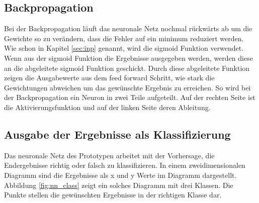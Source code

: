 
\subsection{Backpropagation}
Bei der Backpropagation läuft das neuronale Netz nochmal rückwärts ab um die Gewichte so zu verändern, dass die Fehler auf ein minimum reduziert werden. Wie schon in Kapitel \ref{sec:inp} genannt, wird die sigmoid Funktion verwendet. Wenn aus der sigmoid Funktion die Ergebnisse ausgegeben werden, werden diese an die abgeleitete sigmoid Funktion geschickt. Durch diese abgeleitete Funktion zeigen die Ausgabewerte aus dem feed forward Schritt, wie stark die Gewichtungen abweichen um das gewünschte Ergebnis zu erreichen.
\newline
So wird bei der Backpropagation ein Neuron in zwei Teile aufgeteilt. Auf der rechten Seite ist die Aktivierungsfunktion und auf der linken Seite deren Ableitung. 

\subsection{Ausgabe der Ergebnisse als Klassifizierung}
Das neuronale Netz des Prototypen arbeitet mit der Vorhersage, die Endergebnisse richtig oder falsch zu klassifizieren. In einem zweidimensionalen Diagramm sind die Ergebnisse als x und y Werte im Diagramm dargestellt. Abbildung \ref{fig:nn_class} zeigt ein solches Diagramm mit drei Klassen. Die Punkte stellen die gewünschten Ergebnisse in der richtigen Klasse dar.

